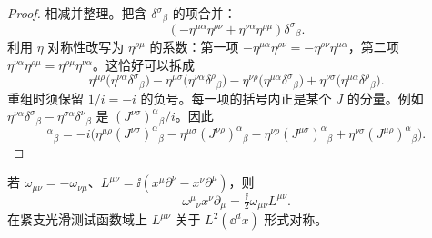 \begin{proof}
相减并整理。把含 $\delta^\sigma{}_\beta$ 的项合并：
\begin{equation*}
(-\eta^{\mu\alpha}\eta^{\rho\nu}+\eta^{\nu\alpha}\eta^{\rho\mu})\delta^\sigma{}_\beta.
\end{equation*}
利用 $\eta$ 对称性改写为 $\eta^{\rho\mu}$ 的系数：第一项 $-\eta^{\mu\alpha}\eta^{\rho\nu}=-\eta^{\rho\nu}\eta^{\mu\alpha}$，第二项 $\eta^{\nu\alpha}\eta^{\rho\mu}=\eta^{\rho\mu}\eta^{\nu\alpha}$。这恰好可以拆成
\begin{equation*}
\eta^{\mu\rho}\big(\eta^{\nu\alpha}\delta^\sigma{}_\beta\big)-\eta^{\mu\sigma}\big(\eta^{\nu\alpha}\delta^\rho{}_\beta\big)-\eta^{\nu\rho}\big(\eta^{\mu\alpha}\delta^\sigma{}_\beta\big)+\eta^{\nu\sigma}\big(\eta^{\mu\alpha}\delta^\rho{}_\beta\big).
\end{equation*}
重组时须保留 $1/i=-i$ 的负号。每一项的括号内正是某个 $J$ 的分量。例如 $\eta^{\nu\alpha}\delta^\sigma{}_\beta-\eta^{\sigma\alpha}\delta^\nu{}_\beta$ 是 $(J^{\nu\sigma})^\alpha{}_\beta/i$。因此
\begin{equation*}
[J^{\mu\nu},J^{\rho\sigma}]^\alpha{}_\beta
=-i\Big(\eta^{\mu\rho}(J^{\nu\sigma})^\alpha{}_\beta-\eta^{\mu\sigma}(J^{\nu\rho})^\alpha{}_\beta-\eta^{\nu\rho}(J^{\mu\sigma})^\alpha{}_\beta+\eta^{\nu\sigma}(J^{\mu\rho})^\alpha{}_\beta\Big).
\end{equation*}
\end{proof}

\begin{proposition}
若 $\omega_{\mu\nu}=-\omega_{\nu\mu}$、$L^{\mu\nu}=\ii(x^\mu\partial^\nu-x^\nu\partial^\mu)$，则\[\omega^\mu{}_\nu x^\nu\partial_\mu=\tfrac{\ii}{2}\omega_{\mu\nu}L^{\mu\nu}.\]在紧支光滑测试函数域上 $L^{\mu\nu}$ 关于 $L^2(\dd^dx)$ 形式对称。
\end{proposition}

